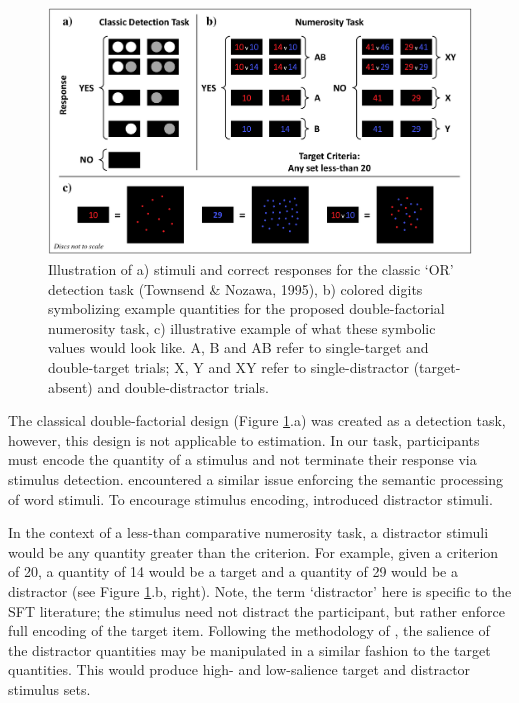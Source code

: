\begin{figure}[hbt]
\centering \includegraphics[width=\linewidth]{Figures/Estimation/ExampleIllustration.pdf}
\caption{Illustration of a) stimuli and correct responses for the classic `OR' detection task (Townsend \& Nozawa, 1995), b) colored digits symbolizing example quantities for the proposed double-factorial numerosity task, c) illustrative example of what these symbolic values would look like. A, B and AB refer to single-target and double-target trials; X, Y and XY refer to single-distractor (target-absent) and double-distractor trials.}
\label{fig:EgIllus}
\end{figure}



The classical  double-factorial design (Figure \ref{fig:EgIllus}.a) was created as a detection task, however, this design is not applicable to estimation. In our task, participants must encode the quantity of a stimulus and not terminate their response via stimulus detection. \citeauthor{eidels2010stroop} encountered a similar issue enforcing the semantic processing of word stimuli. To encourage stimulus encoding, \citeauthor{eidels2010stroop} introduced distractor stimuli.

In the context of a less-than comparative numerosity task, a distractor stimuli would be any quantity greater than the criterion. For example, given a criterion of 20, a quantity of 14 would be a target and a quantity of 29 would be a distractor (see Figure \ref{fig:EgIllus}.b, right). Note, the term `distractor' here is specific to the SFT literature; the stimulus need not distract the participant, but rather enforce full encoding of the target item. Following the methodology of \citeauthor[(but see also, Little, Eidels, Fifić \& Wang, 2018\nocite{Little2018_CCF})]{eidels2010stroop}, the salience of the distractor quantities may be manipulated in a similar fashion to the target quantities. This would produce high- and low-salience target and distractor stimulus sets.

